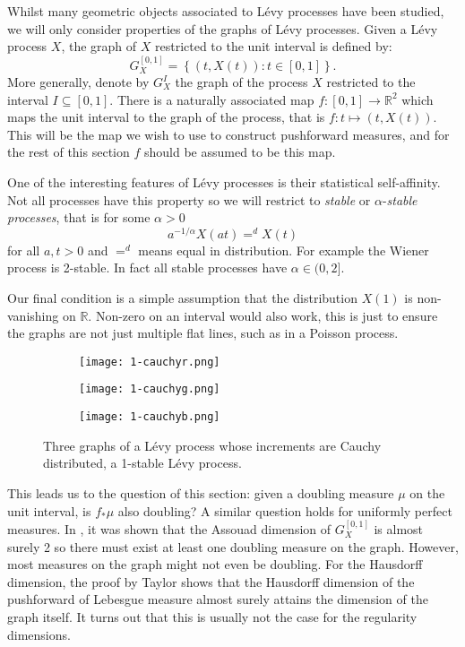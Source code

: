 Whilst many geometric objects associated to L\'evy processes have been studied, we will only consider properties of the graphs of L\'evy processes. Given a L\'evy process $X$, the graph of $X$ restricted to the unit interval is defined by:
\[
G_X^{[0,1]} = \left\{ (t,X(t)) \colon t \in [0,1] \right\}.
\]
More generally, denote by $G_X^I$ the graph of the process $X$ restricted to the interval $I \subseteq [0,1]$. There is a naturally associated map $f: [0,1] \rightarrow \mathbb{R}^2$ which maps the unit interval to the graph of the process, that is $f\colon t \mapsto (t,X(t))$. This will be the map we wish to use to construct pushforward measures, and for the rest of this section $f$ should be assumed to be this map. 

One of the interesting features of L\'evy processes is their statistical self-affinity. Not all processes have this property so we will restrict to \textit{stable} or $\alpha$-\textit{stable processes}, that is for some $\alpha > 0$
\[
a^{-1/\alpha}X(at) =^d X(t)
\]
for all $a,t > 0$ and $=^d$ means equal in distribution. For example the Wiener process is 2-stable. In fact all stable processes have $\alpha \in (0,2]$. 

Our final condition is a simple assumption that the distribution $X(1)$ is non-vanishing on $\mathbb{R}$. Non-zero on an interval would also work, this is just to ensure the graphs are not just multiple flat lines, such as in a Poisson process.


\begin{figure}[htbp]
	\centering
	\begin{subfigure}{0.3\textwidth}
		\centering
		\texttt{[image: 1-cauchyr.png]}
	\end{subfigure}%
	\begin{subfigure}{.3\textwidth}
		\centering
		\texttt{[image: 1-cauchyg.png]}
	\end{subfigure}%
	\begin{subfigure}{.3\textwidth}
		\centering
		\texttt{[image: 1-cauchyb.png]}
	\end{subfigure}
	\caption{Three graphs of a L\'evy process whose increments are Cauchy distributed, a 1-stable L\'evy process.}
	\label{fig:cauchy}
\end{figure}


This leads us to the question of this section: given a doubling measure $\mu$ on the unit interval, is $f_*\mu$ also doubling? A similar question holds for uniformly perfect measures. In \cite{howroyd-yu}, it was shown that the Assouad dimension of $G_X^{[0,1]}$ is almost surely 2 so there must exist at least one doubling measure on the graph. However, most measures on the graph might not even be doubling. For the Hausdorff dimension, the proof by Taylor shows that the Hausdorff dimension of the pushforward of Lebesgue measure almost surely attains the dimension of the graph itself. It turns out that this is usually not the case for the regularity dimensions.

